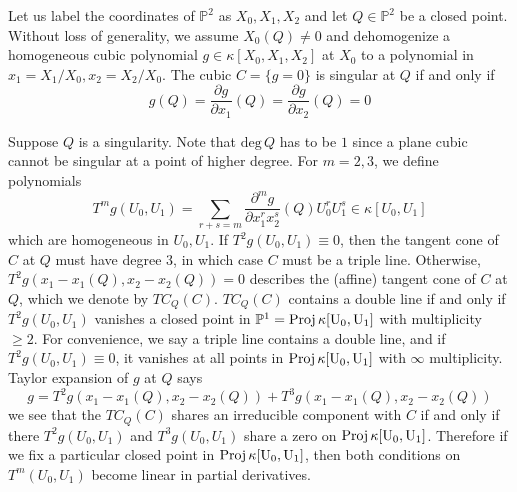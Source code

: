 \documentclass[12pt]{article}
\theoremstyle{plain}
\theoremstyle{definition}
\newcommand{\IA}{\mathbb{A}}
\newcommand{\IP}{\mathbb{P}}
\newcommand{\sT}{\mathcal{T}}
\renewcommand{\deg}{\mathrm{deg}\,}
\newcommand{\Proj}{\rm Proj\,}
\newcommand{\<}{\langle}
\renewcommand{\>}{\rangle}
\newcommand{\p}{\partial}
\begin{document}
Let us label the coordinates of $\IP^2$ as $X_0, X_1, X_2$ and let $Q \in \IP^2$ be a closed point. Without loss of generality, we assume $X_0(Q) \neq 0$ and dehomogenize a homogeneous cubic polynomial $g \in \kappa[X_0, X_1, X_2]$ at $X_0$ to a polynomial in $x_1 = X_1/X_0, x_2 = X_2/X_0$. The cubic $C = \{g = 0\}$ is singular at $Q$ if and only if 
$$ g(Q) = \frac{\p g}{\p x_1} (Q) = \frac{\p g}{\p x_2}(Q) = 0$$

Suppose $Q$ is a singularity. Note that $\deg Q$ has to be $1$ since a plane cubic cannot be singular at a point of higher degree. %
For $m = 2, 3$, we define polynomials 
$$ T^m g(U_0, U_1) = \sum_{r + s = m} \frac{\p^m g}{\p x_1^r x_2^s}(Q) U_0^r U_1^s \in \kappa[U_0, U_1]$$
which are homogeneous in $U_0, U_1$. If $T^2 g(U_0, U_1) \equiv 0$, then the tangent cone of $C$ at $Q$ must have degree $3$, in which case $C$ must be a triple line. Otherwise, $T^2 g(x_1 - x_1(Q), x_2 - x_2(Q)) = 0$ describes the (affine) tangent cone of $C$ at $Q$, which we denote by $TC_Q(C)$. $TC_Q(C)$ contains a double line if and only if $T^2 g(U_0, U_1)$ vanishes a closed point in $\IP^1 = \Proj \kappa[U_0, U_1]$ with multiplicity $\ge 2$. For convenience, we say a triple line contains a double line, and if $T^2 g(U_0, U_1) \equiv 0$, it vanishes at all points in $\Proj \kappa[U_0, U_1]$ with $\infty$ multiplicity. Taylor expansion of $g$ at $Q$ says
$$ g = T^2 g(x_1 - x_1(Q), x_2 - x_2(Q)) + T^3 g(x_1 - x_1(Q), x_2 - x_2(Q)) $$
we see that the $TC_Q(C)$ shares an irreducible component with $C$ if and only if there $T^2 g(U_0, U_1)$ and $T^3 g(U_0, U_1)$ share a zero on $\Proj \kappa[U_0, U_1]$. Therefore if we fix a particular closed point in $\Proj \kappa[U_0, U_1]$, then both conditions on $T^m(U_0, U_1)$ become linear in partial derivatives.
\end{document}
